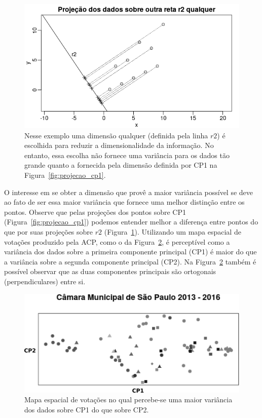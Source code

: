 \documentclass[
	article,			%
	12pt,				%
    twoside,			%
	a4paper,			%
	english,			%
	french,				%
	spanish,			%
	brazil,				%
	]{abntex2}
\begin{document}
\begin{figure}[h]
  \centering
  \includegraphics[scale=0.7]{figs/projecao_r2.png}
  \caption{Nesse exemplo uma dimensão qualquer (definida pela linha $r2$) é escolhida para reduzir a dimensionalidade da informação. No entanto, essa escolha não fornece uma variância para os dados tão grande quanto a fornecida pela dimensão definida por CP1 na Figura~\ref{fig:projecao_cp1}.}
  \label{fig:projecao_r2}
\end{figure}

O interesse em se obter a dimensão que provê a maior variância possível se deve ao fato de ser essa maior variância que fornece uma melhor distinção entre os pontos. Observe que pelas projeções dos pontos sobre CP1 (Figura~\ref{fig:projecao_cp1}) podemos entender melhor a diferença entre pontos do que por suas projeções sobre $r2$ (Figura~\ref{fig:projecao_r2}). Utilizando um mapa espacial de votações produzido pela ACP, como o da Figura~\ref{fig:cps}, é perceptível como a variância dos dados sobre a primeira componente principal (CP1) é maior do que a variância sobre a segunda componente principal (CP2). Na Figura~\ref{fig:cps} também é possível observar que as duas componentes principais são ortogonais (perpendiculares) entre si.

\begin{figure}[h]
  \centering
  \includegraphics[scale=0.7]{figs/cps.png}
  \caption{Mapa espacial de votações no qual percebe-se uma maior variância dos dados sobre CP1 do que sobre CP2.}
  \label{fig:cps}
\end{figure}
\end{document}
